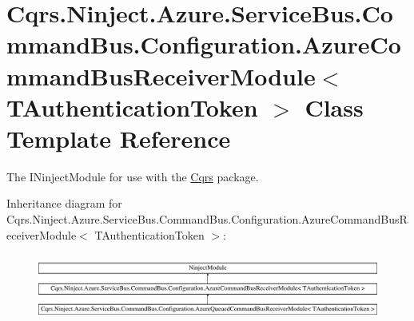 \hypertarget{classCqrs_1_1Ninject_1_1Azure_1_1ServiceBus_1_1CommandBus_1_1Configuration_1_1AzureCommandBusReceiverModule}{}\section{Cqrs.\+Ninject.\+Azure.\+Service\+Bus.\+Command\+Bus.\+Configuration.\+Azure\+Command\+Bus\+Receiver\+Module$<$ T\+Authentication\+Token $>$ Class Template Reference}
\label{classCqrs_1_1Ninject_1_1Azure_1_1ServiceBus_1_1CommandBus_1_1Configuration_1_1AzureCommandBusReceiverModule}


The I\+Ninject\+Module for use with the \hyperlink{namespaceCqrs}{Cqrs} package.  


Inheritance diagram for Cqrs.\+Ninject.\+Azure.\+Service\+Bus.\+Command\+Bus.\+Configuration.\+Azure\+Command\+Bus\+Receiver\+Module$<$ T\+Authentication\+Token $>$\+:\begin{figure}[H]
\begin{center}
\leavevmode
\includegraphics[height=2.231076cm]{classCqrs_1_1Ninject_1_1Azure_1_1ServiceBus_1_1CommandBus_1_1Configuration_1_1AzureCommandBusReceiverModule}
\end{center}
\end{figure}
